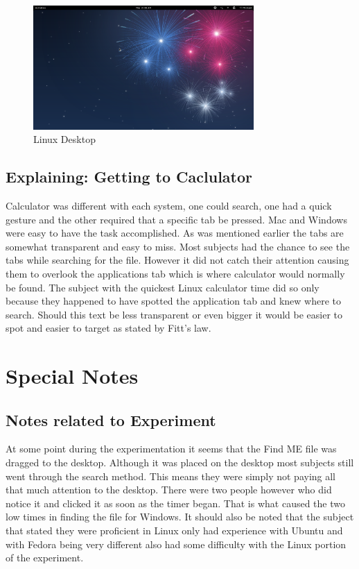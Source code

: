 \documentclass[11pt]{article}
\begin{document}
\begin{figure}[h!]
  \centering
    \includegraphics[width=0.75\textwidth]{./Images/Linux_Main}
  \caption{Linux Desktop}
 \label{LinDesktop}
\end{figure}

\subsection{Explaining: Getting to Caclulator}
Calculator was different with each system, one could search, one had a quick gesture and the other required that a specific tab be pressed. Mac and Windows were easy to have the task accomplished. As was mentioned earlier the tabs are somewhat transparent and easy to miss. Most subjects had the chance to see the tabs while searching for the file. However it did not catch their attention causing them to overlook the applications tab which is where calculator would normally be found. The subject with the quickest Linux calculator time did so only because they happened to have spotted the application tab and knew where to search. Should this text be less transparent or even bigger it would be easier to spot and easier to target as stated by Fitt’s law.

\section{Special Notes}
\subsection{Notes related to Experiment}
At some point during the experimentation it seems that the Find ME file was dragged to the desktop. Although it was placed on the desktop most subjects still went through the search method. This means they were simply not paying all that much attention to the desktop. There were two people however who did notice it and clicked it as soon as the timer began. That is what caused the two low times in finding the file for Windows. It should also be noted that the subject that stated they were proficient in Linux only had experience with Ubuntu and with Fedora being very different also had some difficulty with the Linux portion of the experiment.
\end{document}
